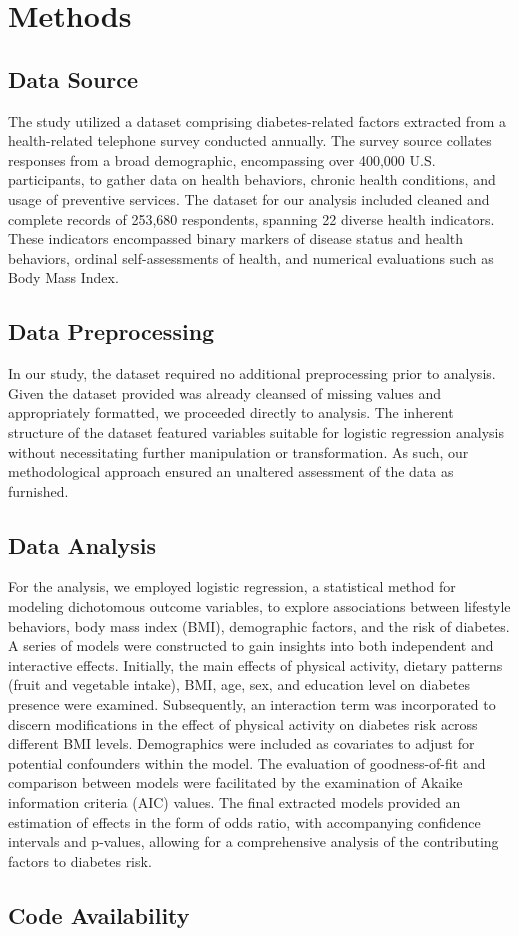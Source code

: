 \documentclass[11pt]{article}
\begin{document}
\section*{Methods}

\subsection*{Data Source}
The study utilized a dataset comprising diabetes-related factors extracted from a health-related telephone survey conducted annually. The survey source collates responses from a broad demographic, encompassing over 400,000 U.S. participants, to gather data on health behaviors, chronic health conditions, and usage of preventive services. The dataset for our analysis included cleaned and complete records of 253,680 respondents, spanning 22 diverse health indicators. These indicators encompassed binary markers of disease status and health behaviors, ordinal self-assessments of health, and numerical evaluations such as Body Mass Index. 

\subsection*{Data Preprocessing}
In our study, the dataset required no additional preprocessing prior to analysis. Given the dataset provided was already cleansed of missing values and appropriately formatted, we proceeded directly to analysis. The inherent structure of the dataset featured variables suitable for logistic regression analysis without necessitating further manipulation or transformation. As such, our methodological approach ensured an unaltered assessment of the data as furnished.

\subsection*{Data Analysis}
For the analysis, we employed logistic regression, a statistical method for modeling dichotomous outcome variables, to explore associations between lifestyle behaviors, body mass index (BMI), demographic factors, and the risk of diabetes. A series of models were constructed to gain insights into both independent and interactive effects. Initially, the main effects of physical activity, dietary patterns (fruit and vegetable intake), BMI, age, sex, and education level on diabetes presence were examined. Subsequently, an interaction term was incorporated to discern modifications in the effect of physical activity on diabetes risk across different BMI levels. Demographics were included as covariates to adjust for potential confounders within the model. The evaluation of goodness-of-fit and comparison between models were facilitated by the examination of Akaike information criteria (AIC) values. The final extracted models provided an estimation of effects in the form of odds ratio, with accompanying confidence intervals and p-values, allowing for a comprehensive analysis of the contributing factors to diabetes risk.\subsection*{Code Availability}
\end{document}
